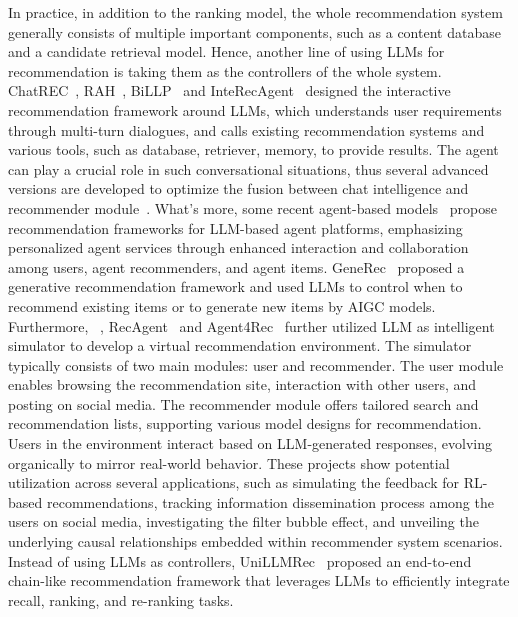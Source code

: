 \documentclass[sn-mathphys-num]{sn-jnl}%
\theoremstyle{thmstyleone}%
\theoremstyle{thmstyletwo}%
\theoremstyle{thmstylethree}%
\begin{document}
In practice, in addition to the ranking model, the whole recommendation system generally consists of multiple important components, such as a content database and a candidate retrieval model.
Hence, another line of using LLMs for recommendation is taking them as the controllers of the whole system.
ChatREC~\cite{DBLP:journals/corr/abs-2303-14524}, RAH~\cite{DBLP:journals/corr/abs-2308-09904}, BiLLP~\cite{Shi2024LargeLM} and InteRecAgent~\cite{DBLP:journals/corr/abs-2308-16505} designed the interactive recommendation framework around LLMs, which understands user requirements through multi-turn dialogues, and calls existing recommendation systems and various tools, such as database, retriever, memory, to provide results. The agent can play a crucial role in such conversational situations, thus several advanced versions are developed to optimize the fusion between chat intelligence and recommender module~\cite{jin2024lending,huang2024can}. 
What's more, some recent agent-based models~\cite{DBLP:journals/corr/abs-2402-18240,zhang2024agentcf} propose recommendation frameworks for LLM-based agent platforms, emphasizing personalized agent services through enhanced interaction and collaboration among users, agent recommenders, and agent items.
GeneRec~\cite{DBLP:journals/corr/abs-2304-03516} proposed a generative recommendation framework and used LLMs to control when to recommend existing items or to generate new items by AIGC models. 
Furthermore, ~\cite{DBLP:journals/corr/abs-2403-09738}, RecAgent~\cite{wang2023recagent} and Agent4Rec~\cite{DBLP:journals/corr/abs-2310-10108} further utilized LLM as intelligent simulator to develop a virtual recommendation environment. The simulator typically consists of two main modules: user and recommender. The user module enables browsing the recommendation site, interaction with other users, and posting on social media. The recommender module offers tailored search and recommendation lists, supporting various model designs for recommendation. Users in the environment interact based on LLM-generated responses, evolving organically to mirror real-world behavior. 
These projects show potential utilization across several applications, such as simulating the feedback for RL-based recommendations, tracking information dissemination process among the users on social media, investigating the filter bubble effect, and unveiling the underlying causal relationships embedded within recommender system scenarios.
Instead of using LLMs as controllers, UniLLMRec~\cite{DBLP:journals/corr/abs-2404-00702} proposed an end-to-end chain-like recommendation framework that leverages LLMs to efficiently integrate recall, ranking, and re-ranking tasks.
\end{document}
